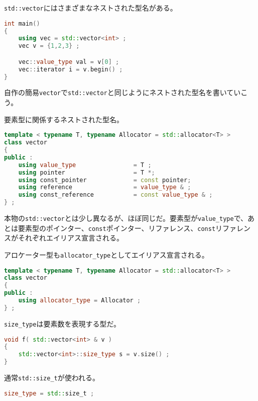\clearpage
{}

\texttt{std::vector}にはさまざまなネストされた型名がある。

\begin{lstlisting}[language={C++}]
int main()
{
    using vec = std::vector<int> ;
    vec v = {1,2,3} ;

    vec::value_type val = v[0] ;
    vec::iterator i = v.begin() ;
}
\end{lstlisting}

自作の簡易\texttt{vector}で\texttt{std::vector}と同じようにネストされた型名を書いていこう。

要素型に関係するネストされた型名。

\begin{lstlisting}[language={C++}]
template < typename T, typename Allocator = std::allocator<T> >
class vector
{
public :
    using value_type                = T ;
    using pointer                   = T *;
    using const_pointer             = const pointer;
    using reference                 = value_type & ;
    using const_reference           = const value_type & ;
} ;
\end{lstlisting}

本物の\texttt{std::vector}とは少し異なるが、ほぼ同じだ。要素型が\texttt{value\_type}で、あとは要素型のポインター、\texttt{const}ポインター、リファレンス、\texttt{const}リファレンスがそれぞれエイリアス宣言される。

アロケーター型も\texttt{allocator\_type}としてエイリアス宣言される。

\begin{lstlisting}[language={C++}]
template < typename T, typename Allocator = std::allocator<T> >
class vector
{
public :
    using allocator_type = Allocator ;
} ;
\end{lstlisting}

\texttt{size\_type}は要素数を表現する型だ。

\ifTombow\enlargethispage{3mm}\fi
\begin{lstlisting}[language={C++}]
void f( std::vector<int> & v )
{
    std::vector<int>::size_type s = v.size() ;
}
\end{lstlisting}

通常\texttt{std::size\_t}が使われる。

\begin{lstlisting}[language={C++}]
size_type = std::size_t ;
\end{lstlisting}

